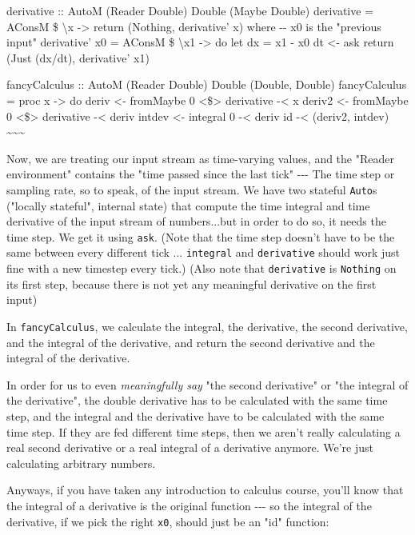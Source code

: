 \documentclass[]{article}
\begin{document}
derivative :: AutoM (Reader Double) Double (Maybe Double) derivative = AConsM \$
\textbackslash{}x -\textgreater{} return (Nothing, derivative' x) where -\/- x0
is the "previous input" derivative' x0 = AConsM \$ \textbackslash{}x1
-\textgreater{} do let dx = x1 - x0 dt \textless{}- ask return (Just (dx/dt),
derivative' x1)

fancyCalculus :: AutoM (Reader Double) Double (Double, Double) fancyCalculus =
proc x -\textgreater{} do deriv \textless{}- fromMaybe 0
\textless{}\$\textgreater{} derivative -\textless{} x deriv2 \textless{}-
fromMaybe 0 \textless{}\$\textgreater{} derivative -\textless{} deriv intdev
\textless{}- integral 0 -\textless{} deriv id -\textless{} (deriv2, intdev)
\textasciitilde{}\textasciitilde{}\textasciitilde{}

Now, we are treating our input stream as time-varying values, and the "Reader
environment" contains the "time passed since the last tick" -\/-\/- The time
step or sampling rate, so to speak, of the input stream. We have two stateful
\texttt{Auto}s ("locally stateful", internal state) that compute the time
integral and time derivative of the input stream of numbers...but in order to do
so, it needs the time step. We get it using \texttt{ask}. (Note that the time
step doesn't have to be the same between every different tick ...
\texttt{integral} and \texttt{derivative} should work just fine with a new
timestep every tick.) (Also note that \texttt{derivative} is \texttt{Nothing} on
its first step, because there is not yet any meaningful derivative on the first
input)

In \texttt{fancyCalculus}, we calculate the integral, the derivative, the second
derivative, and the integral of the derivative, and return the second derivative
and the integral of the derivative.

In order for us to even \emph{meaningfully say} "the second derivative" or "the
integral of the derivative", the double derivative has to be calculated with the
same time step, and the integral and the derivative have to be calculated with
the same time step. If they are fed different time steps, then we aren't really
calculating a real second derivative or a real integral of a derivative anymore.
We're just calculating arbitrary numbers.

Anyways, if you have taken any introduction to calculus course, you'll know that
the integral of a derivative is the original function -\/-\/- so the integral of
the derivative, if we pick the right \texttt{x0}, should just be an "id"
function:
\end{document}
